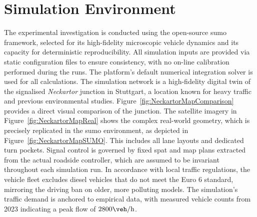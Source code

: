 \section{Simulation Environment}
\label{sec:SimEnvironment}

The experimental investigation is conducted using the open-source \ac{sumo} framework, selected for its high-fidelity microscopic vehicle dynamics and its capacity for deterministic reproducibility. All simulation inputs are provided via static configuration files to ensure consistency, with no on-line calibration performed during the runs. The platform's default numerical integration solver is used for all calculations.
\mynewline
The simulation network is a high-fidelity digital twin of the signalised \emph{Neckartor} junction in Stuttgart, a location known for heavy traffic and previous environmental studies. Figure~\vref{fig:NeckartorMapComparison} provides a direct visual comparison of the junction. The satellite imagery in Figure~\vref{fig:NeckartorMapReal} shows the complex real-world geometry, which is precisely replicated in the \ac{sumo} environment, as depicted in Figure~\vref{fig:NeckartorMapSUMO}. This includes all lane layouts and dedicated turn pockets. Signal control is governed by fixed \ac{spat} and \ac{map} plans extracted from the actual roadside controller, which are assumed to be invariant throughout each simulation run. In accordance with local traffic regulations, the vehicle fleet excludes diesel vehicles that do not meet the Euro 6 standard, mirroring the driving ban on older, more polluting models. The simulation's traffic demand is anchored to empirical data, with measured vehicle counts from 2023 indicating a peak flow of $2800\unit{\veh\per\hour}$.
\mynewline

